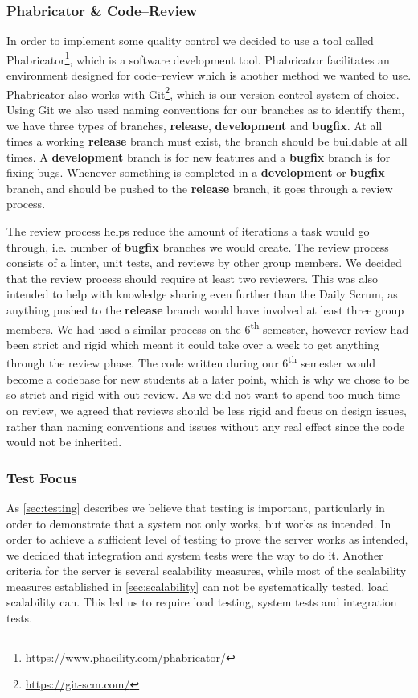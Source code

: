 \subsubsection{Phabricator \& Code--Review}
In order to implement some quality control we decided to use a tool called Phabricator\footnote{\url{https://www.phacility.com/phabricator/}}, which is a software development tool.
Phabricator facilitates an environment designed for code--review which is another method we wanted to use.
Phabricator also works with Git\footnote{\url{https://git-scm.com/}}, which is our version control system of choice.
Using Git we also used naming conventions for our branches as to identify them, we have three types of branches, \textbf{release}, \textbf{development} and \textbf{bugfix}.
At all times a working \textbf{release} branch must exist, the branch should be buildable at all times.
A \textbf{development} branch is for new features and a \textbf{bugfix} branch is for fixing bugs.
Whenever something is completed in a \textbf{development} or \textbf{bugfix} branch, and should be pushed to the \textbf{release} branch, it goes through a review process.

The review process helps reduce the amount of iterations a task would go through, i.e. number of \textbf{bugfix} branches we would create.
The review process consists of a linter, unit tests, and reviews by other group members.
We decided that the review process should require at least two reviewers.
This was also intended to help with knowledge sharing even further than the Daily Scrum, as anything pushed to the \textbf{release} branch would have involved at least three group members.
We had used a similar process on the 6\textsuperscript{th} semester, however review had been strict and rigid which meant it could take over a week to get anything through the review phase.
The code written during our 6\textsuperscript{th} semester would become a codebase for new students at a later point, which is why we chose to be so strict and rigid with out review.
As we did not want to spend too much time on review, we agreed that reviews should be less rigid and focus on design issues, rather than naming conventions and issues without any real effect since the code would not be inherited.
\subsubsection{Test Focus}
As \cref{sec:testing} describes we believe that testing is important, particularly in order to demonstrate that a system not only works, but works as intended.
In order to achieve a sufficient level of testing to prove the server works as intended, we decided that integration and system tests were the way to do it.
Another criteria for the server is several scalability measures, while most of the scalability measures established in \cref{sec:scalability} can not be systematically tested, load scalability can.
This led us to require load testing, system tests and integration tests.
